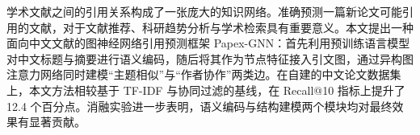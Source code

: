 
学术文献之间的引用关系构成了一张庞大的知识网络。准确预测一篇新论文可能引用的文献，对于文献推荐、科研趋势分析与学术检索具有重要意义。本文提出一种面向中文文献的图神经网络引用预测框架 Papex-GNN：首先利用预训练语言模型对中文标题与摘要进行语义编码，随后将其作为节点特征接入引文图，通过异构图注意力网络同时建模“主题相似”与“作者协作”两类边。在自建的中文论文数据集上，本文方法相较基于 TF-IDF 与协同过滤的基线，在 Recall@10 指标上提升了 12.4 个百分点。消融实验进一步表明，语义编码与结构建模两个模块均对最终效果有显著贡献。
